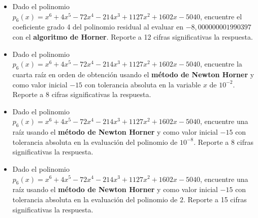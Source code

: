 \documentclass[12pt]{article}
\begin{document}
\begin{itemize}
\item Dado el polinomio \(p_6(x)=x^6+4x^5-72x^4-214x^3+1127x^2+1602x-5040\), encuentre el coeficiente grado 4 del polinomio residual al evaluar en \(-8{,}000000001990397\) con el \textbf{algoritmo de Horner}. Reporte a 12 cifras significativas la respuesta.
\item Dado el polinomio \(p_6(x)=x^6+4x^5-72x^4-214x^3+1127x^2+1602x-5040\), encuentre la cuarta raíz en orden de obtención usando el \textbf{método de Newton Horner} y como valor inicial \(-15\) con tolerancia absoluta en la variable \(x\) de \(10^{-2}\). Reporte a 8 cifras significativas la respuesta.
\item Dado el polinomio \(p_6(x)=x^6+4x^5-72x^4-214x^3+1127x^2+1602x-5040\), encuentre una raíz usando el \textbf{método de Newton Horner} y como valor inicial \(-15\) con tolerancia absoluta en la evaluación del polinomio de \(10^{-8}\). Reporte a 8 cifras significativas la respuesta.
\item Dado el polinomio \(p_6(x)=x^6+4x^5-72x^4-214x^3+1127x^2+1602x-5040\), encuentre una raíz usando el \textbf{método de Newton Horner} y como valor inicial \(-15\) con tolerancia absoluta en la evaluación del polinomio de \(2\). Reporte a 15 cifras significativas la respuesta.
\end{itemize}
\end{document}
